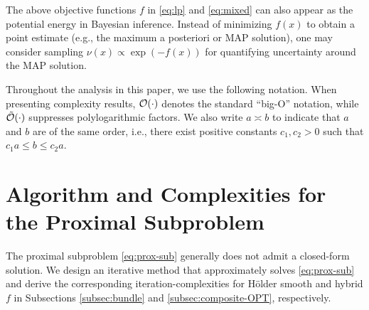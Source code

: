 \documentclass[11pt,letterpaper]{article}
\newcommand{\argmin}{\mathrm{argmin}\,}
\begin{document}
The above objective functions $f$ in \eqref{eq:lp} and \eqref{eq:mixed} can also appear as the potential energy in 
Bayesian inference. 
Instead of minimizing $f(x)$ to obtain a point estimate (e.g., the maximum a posteriori or MAP solution), one may consider sampling $\nu(x) \propto \exp(-f(x))$ for quantifying uncertainty around the MAP solution.





Throughout the analysis in this paper, we use the following notation. 
When presenting complexity results, ${\cal O}(\cdot)$ denotes the standard ``big-O'' notation, 
while $\tilde {\cal O}(\cdot)$ suppresses polylogarithmic factors. 
We also write $a \asymp b$ to indicate that $a$ and $b$ are of the same order, 
i.e., there exist positive constants $c_1, c_2 > 0$ such that 
$c_1 a \le b \le c_2 a$. 


\section{Algorithm and Complexities for the Proximal Subproblem}\label{sec:opt}

The proximal subproblem \eqref{eq:prox-sub} generally does not admit a closed-form solution. We design an iterative method that approximately solves \eqref{eq:prox-sub} and derive the corresponding iteration-complexities for Hölder smooth and hybrid $f$ in Subsections \ref{subsec:bundle} and \ref{subsec:composite-OPT}, respectively.
\end{document}
